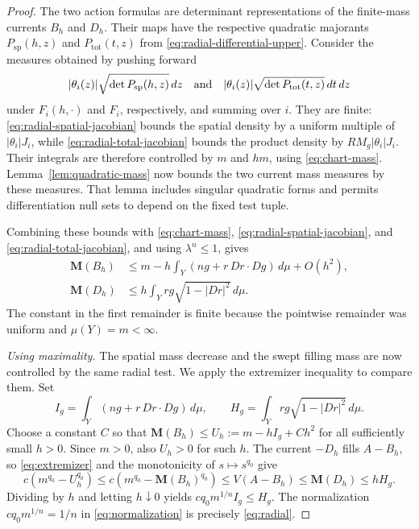 \documentclass[11pt]{article}
\numberwithin{equation}{section}
\theoremstyle{definition}
\theoremstyle{remark}
\begin{document}
\begin{proof}
The two action formulas are determinant representations of the
finite-mass currents $B_h$ and $D_h$. Their maps have the respective
quadratic majorants $P_{\mathrm{sp}}(h,z)$ and
$P_{\mathrm{tot}}(t,z)$ from
\eqref{eq:radial-differential-upper}. Consider the measures obtained
by pushing forward
\[
 |\theta_i(z)|\sqrt{\det P_{\mathrm{sp}}(h,z)}\,d z
 \quad\hbox{and}\quad
 |\theta_i(z)|\sqrt{\det P_{\mathrm{tot}}(t,z)}\,d t\,d z
\]
under $F_i(h,\cdot)$ and $F_i$, respectively, and summing over $i$.
They are finite: \eqref{eq:radial-spatial-jacobian} bounds the
spatial density by a uniform multiple of $|\theta_i|J_i$, while
\eqref{eq:radial-total-jacobian} bounds the product density by
$RM_g|\theta_i|J_i$. Their integrals are therefore controlled by
$m$ and $h m$, using \eqref{eq:chart-mass}.
Lemma~\ref{lem:quadratic-mass} now bounds the two current mass
measures by these measures. That lemma includes singular quadratic
forms and permits differentiation null sets to depend on the fixed
test tuple.

Combining these bounds with \eqref{eq:chart-mass},
\eqref{eq:radial-spatial-jacobian}, and
\eqref{eq:radial-total-jacobian}, and using $\lambda^n\leq1$,
gives
\begin{align}
 \mathbf M(B_h)
 &\leq m-h\int_Y(ng+r\,Dr\cdot Dg)\,d\mu+O(h^2),
       \label{eq:radial-spatial-mass}\\
 \mathbf M(D_h)
 &\leq h\int_Y rg\sqrt{1-|Dr|^2}\,d\mu.
       \label{eq:radial-homotopy-mass}
\end{align}
The constant in the first remainder is finite because the
pointwise remainder was uniform and $\mu(Y)=m<\infty$.

\emph{Using maximality.}
The spatial mass decrease and the swept filling mass are now controlled
by the same radial test. We apply the extremizer inequality to compare
them. Set
\[
 I_g=\int_Y(ng+r\,Dr\cdot Dg)\,d\mu,
 \qquad H_g=\int_Y rg\sqrt{1-|Dr|^2}\,d\mu.
\]
Choose a constant $C$ so that
$\mathbf M(B_h)\leq U_h:=m-hI_g+Ch^2$ for all sufficiently small
$h>0$.  Since $m>0$, also $U_h>0$ for such $h$.  The current
$-D_h$ fills $A-B_h$, so \eqref{eq:extremizer} and the
monotonicity of $s\mapsto s^{q_0}$ give
\[
 c(m^{q_0}-U_h^{q_0})
 \leq c(m^{q_0}-\mathbf M(B_h)^{q_0})
 \leq V(A-B_h)\leq\mathbf M(D_h)\leq hH_g.
\]
Dividing by $h$ and letting $h\downarrow0$ yields
$c q_0m^{1/n}I_g\leq H_g$.  The normalization
$c q_0m^{1/n}=1/n$ in \eqref{eq:normalization} is precisely
\eqref{eq:radial}.
\end{proof}
\end{document}
